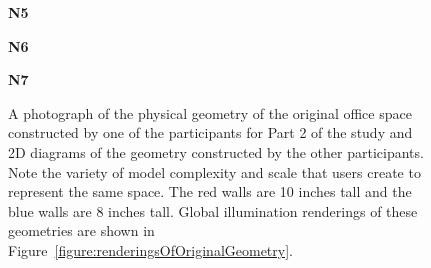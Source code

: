 \begin{figure}[t]
\begin{center}
\begin{minipage}{0.7in}{\bf N5}\end{minipage}
\begin{minipage}{0.7in}{\bf N6}\end{minipage}
\begin{minipage}{0.7in}{\bf N7}\end{minipage}\vspace{-0.08in}%
\end{center}
  \caption{
  \label{figure:original_designs}
A photograph of the physical geometry of the original office space
constructed by one of the participants for Part 2 of the study and 2D
diagrams of the geometry constructed by the other participants.  Note
the variety of model complexity and scale that users create to
represent the same space.  The red walls are 10 inches tall and the
blue walls are 8 inches tall.  Global illumination renderings of these
geometries are shown in
Figure~\ref{figure:renderingsOfOriginalGeometry}.
}
\end{figure}


